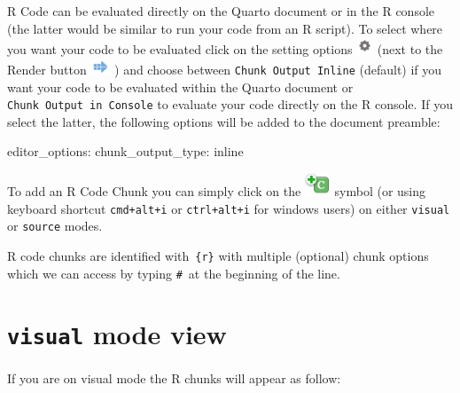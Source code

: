 \documentclass[
  letterpaper,
  DIV=11,
  numbers=noendperiod]{scrartcl}
\newenvironment{Shaded}{\begin{snugshade}}{\end{snugshade}}
\newcommand{\NormalTok}[1]{\textcolor[rgb]{0.00,0.23,0.31}{#1}}
\newcommand{\SpecialCharTok}[1]{\textcolor[rgb]{0.37,0.37,0.37}{#1}}
\begin{document}
R Code can be evaluated directly on the Quarto document or in the R
console (the latter would be similar to run your code from an R script).
To select where you want your code to be evaluated click on the setting
options
\includegraphics[width=0.19792in,height=\textheight]{images/settings.png}
(next to the Render button
\includegraphics[width=0.22917in,height=\textheight]{images/rstudio-render-button.png}
) and choose between \texttt{Chunk\ Output\ Inline} (default) if you
want your code to be evaluated within the Quarto document or
\texttt{Chunk\ Output\ in\ Console} to evaluate your code directly on
the R console. If you select the latter, the following options will be
added to the document preamble:

\begin{Shaded}
\begin{Highlighting}[]
\NormalTok{editor\_options}\SpecialCharTok{:} 
\NormalTok{  chunk\_output\_type}\SpecialCharTok{:}\NormalTok{ inline}
\end{Highlighting}
\end{Shaded}

To add an R Code Chunk you can simply click on the
\includegraphics[width=0.30208in,height=\textheight]{images/chunk.png}
symbol (or using keyboard shortcut \texttt{cmd+alt+i} or
\texttt{ctrl+alt+i} for windows users) on either \texttt{visual} or
\texttt{source} modes.

R code chunks are identified with~\texttt{\{r\}} with multiple
(optional) chunk options which we can access by typing
\texttt{\#\textbar{}}~at the beginning of the line.

\section{\texorpdfstring{\texttt{visual} mode view}{visual mode view}}

If you are on visual mode the R chunks will appear as follow:
\end{document}
